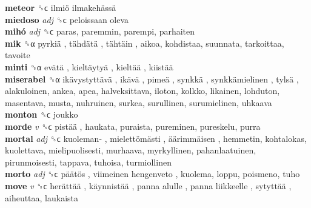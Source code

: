 \textbf{meteor} ␝ϲ   ilmiö ilmakehässä   \\
\textbf{miedoso} \emph{adj}  ␝ϲ   peloissaan oleva   \\
\textbf{mihó} \emph{adj}  ␝ϲ  paras, paremmin, parempi, parhaiten  \\
\textbf{mik} ␝α   pyrkiä ,  tähdätä ,  tähtäin , aikoa, kohdistaa, suunnata, tarkoittaa, tavoite  \\
\textbf{minti} ␝α   evätä ,  kieltäytyä ,  kieltää ,  kiistää   \\
\textbf{miserabel} ␝α   ikävystyttävä ,  ikävä ,  pimeä ,  synkkä ,  synkkämielinen ,  tylsä , alakuloinen, ankea, apea, halveksittava, iloton, kolkko, likainen, lohduton, masentava, musta, nuhruinen, surkea, surullinen, surumielinen, uhkaava  \\
\textbf{monton} ␝ϲ  joukko  \\
\textbf{morde} \emph{v}  ␝ϲ   pistää , haukata, puraista, pureminen, pureskelu, purra  \\
\textbf{mortal} \emph{adj}  ␝ϲ   kuoleman- ,  mielettömästi ,  äärimmäisen , hemmetin, kohtalokas, kuolettava, mielipuolisesti, murhaava, myrkyllinen, pahanlaatuinen, pirunmoisesti, tappava, tuhoisa, turmiollinen  \\
\textbf{morto} \emph{adj}  ␝ϲ   päätös ,  viimeinen hengenveto , kuolema, loppu, poismeno, tuho  \\
\textbf{move} \emph{v}  ␝ϲ   herättää ,  käynnistää ,  panna alulle ,  panna liikkeelle ,  sytyttää , aiheuttaa, laukaista  \\
